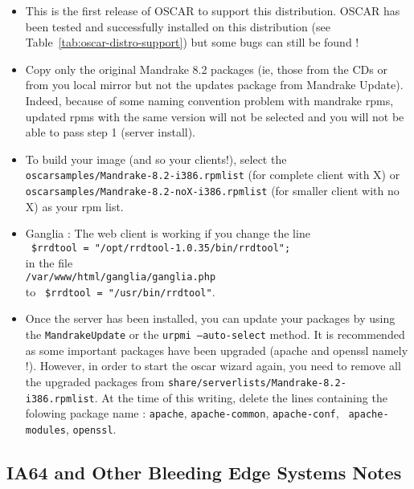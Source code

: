 \begin{itemize}
\item This is the first release of OSCAR to support this distribution. OSCAR
  \oscarversion\- has been tested and successfully installed 
  on this distribution (see Table~\ref{tab:oscar-distro-support}) but some
  bugs can still be found !
\item Copy only the original Mandrake 8.2 packages (ie, those from the CDs or
from you local mirror but not the updates package from Mandrake Update).
Indeed, because of some naming convention problem with mandrake rpms, updated rpms with the
same version will not be selected and you will not be able to pass step 1
(server install).
\item To build your image (and so your clients!), select the {\tt
oscarsamples/Mandrake-8.2-i386.rpmlist} (for complete client with X) or
{\tt oscarsamples/Mandrake-8.2-noX-i386.rpmlist} (for smaller client with no
X) as your rpm list.
\item Ganglia : The web client is working if you change the line \\
\verb+ $rrdtool = "/opt/rrdtool-1.0.35/bin/rrdtool";+ \\
in the file \\
{\tt /var/www/html/ganglia/ganglia.php}\\ to 
\verb+ $rrdtool = "/usr/bin/rrdtool"+.
\item Once the server has been installed, you can update your packages by
using the {\tt MandrakeUpdate} or the {\tt urpmi --auto-select} method. It is
recommended as some important packages have been upgraded (apache and openssl
namely !). 
However, in order to start the oscar wizard again, you need to remove all the 
upgraded packages from {\tt share/serverlists/Mandrake-8.2-i386.rpmlist}. 
At the time of this writing, delete the lines containing the folowing package
name : {\tt  apache}, {\tt apache-common}, {\tt apache-conf}, {\tt
apache-modules}, {\tt openssl}.
\end{itemize}


\subsection{IA64 and Other Bleeding Edge Systems Notes}
\label{subsec:ia64notes}

